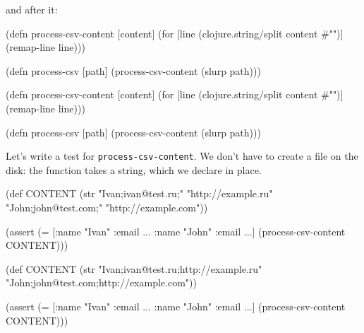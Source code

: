 \fi

\noindent
and after it:

\ifx\DEVICETYPE\MOBILE

\begin{english}
  \begin{clojure}
(defn process-csv-content [content]
  (for [line (clojure.string/split
               content #"\n")]
    (remap-line line)))

(defn process-csv [path]
  (process-csv-content (slurp path)))
  \end{clojure}
\end{english}

\else

\begin{english}
  \begin{clojure}
(defn process-csv-content [content]
  (for [line (clojure.string/split content #"\n")]
    (remap-line line)))

(defn process-csv [path]
  (process-csv-content (slurp path)))
  \end{clojure}
\end{english}

\fi

Let's write a test for \verb|process-csv-content|. We don't have to create a file on the disk: the function takes a string, which we declare in place.

\ifx\DEVICETYPE\MOBILE

\begin{english}
  \begin{clojure}
(def CONTENT
  (str "Ivan;ivan@test.ru;"
       "http://example.ru"
       \newline
       "John;john@test.com;"
       "http://example.com"))

(assert
  (= [{:name "Ivan" :email ...}
      {:name "John" :email ...}]
     (process-csv-content CONTENT)))
  \end{clojure}
\end{english}

\else

\begin{english}
  \begin{clojure}
(def CONTENT
  (str "Ivan;ivan@test.ru;http://example.ru"
       \newline
       "John;john@test.com;http://example.com"))

(assert (= [{:name "Ivan" :email ...}
            {:name "John" :email ...}]
           (process-csv-content CONTENT)))
  \end{clojure}
\end{english}

